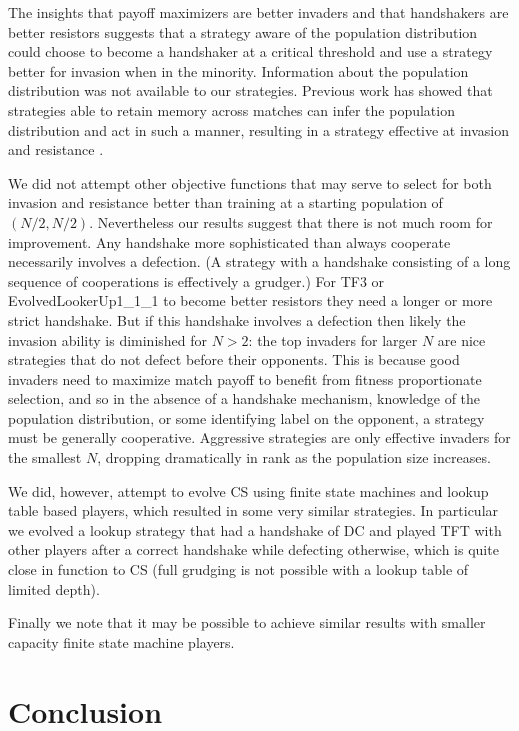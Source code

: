 \documentclass[10pt,letterpaper]{article}
\begin{document}
The insights that payoff maximizers are better invaders and that handshakers
are better resistors suggests that a strategy
aware of the population distribution could choose to become a handshaker at
a critical threshold and use a strategy better for invasion when in the
minority. Information about the population distribution was not available
to our strategies. Previous work has showed that strategies able to retain
memory across matches can infer the population distribution and act in such
a manner, resulting in a strategy effective at invasion and resistance
\cite{Lee2015}.

We did not attempt other objective functions that may serve to select for both
invasion and resistance better than training at a starting population of
$(N/2, N/2)$. Nevertheless our results suggest that there is not much room for
improvement. Any handshake more sophisticated than always cooperate necessarily involves
a defection. (A strategy with a handshake consisting of a long sequence of cooperations is
effectively a grudger.) For TF3 or EvolvedLookerUp1\_1\_1 to become better resistors
they need a longer or more strict handshake. But if this handshake involves
a defection then likely the invasion ability is diminished for $N > 2$: the top
invaders for larger $N$ are nice strategies that do not defect before their
opponents. This is because good invaders need to maximize match payoff to benefit
from fitness proportionate selection,
and so in the absence of a handshake mechanism, knowledge of the population
distribution, or some identifying label on the opponent,
a strategy must be generally cooperative. Aggressive strategies
are only effective invaders for the smallest $N$, dropping dramatically in rank
as the population size increases.

We did, however, attempt to evolve CS using finite state machines and lookup table
based players,
which resulted in some very similar strategies. In particular we evolved a
lookup strategy that had a handshake of DC and played TFT with other players
after a correct handshake while defecting otherwise, which is quite close in
function to CS (full grudging is not possible with a lookup table of limited
depth).

Finally we note that it may be possible to achieve similar results with smaller
capacity finite state machine players.

\section*{Conclusion}
\end{document}
